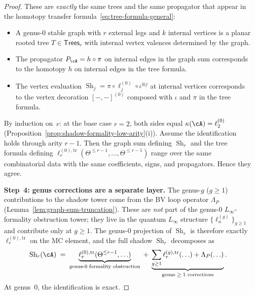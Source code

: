 \begin{theorem}
\begin{proof}
These are \emph{exactly} the same trees and the same
propagator that appear in the homotopy transfer
formula~\eqref{eq:tree-formula-general}:
\begin{itemize}
\item A genus-$0$ stable graph with $r$ external legs
  and $k$ internal vertices is a planar rooted tree
  $T \in \mathsf{Trees}_r$ with internal vertex
  valences determined by the graph.
\item The propagator $P_\cA = h \circ \pi$ on internal
  edges in the graph sum corresponds to the homotopy
  $h$ on internal edges in the tree formula.
\item The vertex evaluation
  $\operatorname{Sh}_j = \pi \circ \ell_j^{(0)}
  \circ \iota^{\otimes j}$ at internal vertices
  corresponds to the vertex decoration $[-,-]^{(0)}$
  composed with $\iota$ and $\pi$ in the tree formula.
\end{itemize}
By induction on~$r$: at the base case $r = 2$,
both sides equal $\kappa(\cA) = \ell_2^{(0)}$
(Proposition~\ref{prop:shadow-formality-low-arity}(i)).
Assume the identification holds through arity $r{-}1$.
Then the graph sum defining $\operatorname{Sh}_r$ and
the tree formula defining
$\ell_r^{(0),\mathrm{tr}}(\Theta^{\leq r-1},
\ldots, \Theta^{\leq r-1})$ range over the same
combinatorial data with the same coefficients, signs,
and propagators.  Hence they agree.

\medskip\noindent
\textbf{Step~4: genus corrections are a separate layer.}
The genus-$g$ ($g \geq 1$) contributions to the shadow
tower come from the BV loop operator $\Lambda_P$
(Lemma~\ref{lem:graph-sum-truncation}).  These are
\emph{not} part of the genus-$0$ $L_\infty$-formality
obstruction tower; they live in the quantum $L_\infty$
structure $\{\ell_n^{(g)}\}_{g \geq 1}$ and contribute
only at $g \geq 1$.  The genus-$0$ projection of
$\operatorname{Sh}_r$ is therefore exactly
$\ell_r^{(0),\mathrm{tr}}$ on the MC element, and the
full shadow $\operatorname{Sh}_r$ decomposes as
\[
\operatorname{Sh}_r(\cA)
\;=\;
\underbrace{\ell_r^{(0),\mathrm{tr}}
(\Theta^{\leq r-1}, \ldots)}_{\text{genus-$0$ formality
obstruction}}
\;+\;
\underbrace{\sum_{g \geq 1}
\ell_r^{(g),\mathrm{tr}}(\ldots)
+ \Lambda_P(\ldots)}_{\text{genus $\geq 1$ corrections}}.
\]
At genus~$0$, the identification is exact.
\end{proof}
\end{theorem}

